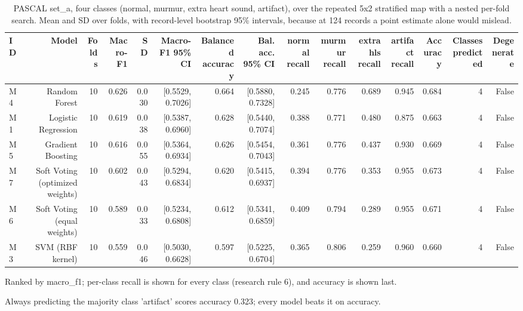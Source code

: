 \begin{table}[htbp]
  \centering
  \caption{PASCAL set\_a, four classes (normal, murmur, extra heart sound, artifact), over the repeated 5x2 stratified map with a nested per-fold search. Mean and SD over folds, with record-level bootstrap 95\% intervals, because at 124 records a point estimate alone would mislead.}
  \label{tab:t11}
  \begin{tabular}{lrrrrrrrrrrrrrr}
    \toprule
    ID & Model & Folds & Macro-F1 & SD & Macro-F1 95\% CI & Balanced accuracy & Bal. acc. 95\% CI & normal recall & murmur recall & extrahls recall & artifact recall & Accuracy & Classes predicted & Degenerate \\
    \midrule
    M4 & Random Forest & 10 & 0.626 & 0.030 & [0.5529, 0.7026] & 0.664 & [0.5880, 0.7328] & 0.245 & 0.776 & 0.689 & 0.945 & 0.684 & 4 & False \\
    M1 & Logistic Regression & 10 & 0.619 & 0.038 & [0.5387, 0.6960] & 0.628 & [0.5440, 0.7074] & 0.388 & 0.771 & 0.480 & 0.875 & 0.663 & 4 & False \\
    M5 & Gradient Boosting & 10 & 0.616 & 0.055 & [0.5364, 0.6934] & 0.626 & [0.5454, 0.7043] & 0.361 & 0.776 & 0.437 & 0.930 & 0.669 & 4 & False \\
    M7 & Soft Voting (optimized weights) & 10 & 0.602 & 0.043 & [0.5294, 0.6834] & 0.620 & [0.5415, 0.6937] & 0.394 & 0.776 & 0.353 & 0.955 & 0.673 & 4 & False \\
    M6 & Soft Voting (equal weights) & 10 & 0.589 & 0.033 & [0.5234, 0.6808] & 0.612 & [0.5341, 0.6859] & 0.409 & 0.794 & 0.289 & 0.955 & 0.671 & 4 & False \\
    M3 & SVM (RBF kernel) & 10 & 0.559 & 0.046 & [0.5030, 0.6628] & 0.597 & [0.5225, 0.6704] & 0.365 & 0.806 & 0.259 & 0.960 & 0.660 & 4 & False \\
    \bottomrule
  \end{tabular}
  \par\footnotesize Ranked by macro\_f1; per-class recall is shown for every class (research rule 6), and accuracy is shown last.
  \par\footnotesize Always predicting the majority class 'artifact' scores accuracy 0.323; every model beats it on accuracy.

\end{table}
